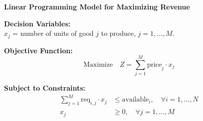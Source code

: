 \documentclass{article}
\begin{document}
\textbf{Linear Programming Model for Maximizing Revenue}

\textbf{Decision Variables:} \\
\( x_j \) = number of units of good \( j \) to produce, \( j = 1, \ldots, M \).

\textbf{Objective Function:} \\
\[
\text{Maximize} \quad Z = \sum_{j=1}^{M} \text{price}_j \cdot x_j
\]

\textbf{Subject to Constraints:}
\begin{align*}
\sum_{j=1}^{M} \text{req}_{i,j} \cdot x_j & \leq \text{available}_i, \quad \forall i = 1, \ldots, N \\
x_j & \geq 0, \quad \forall j = 1, \ldots, M
\end{align*}
\end{document}
